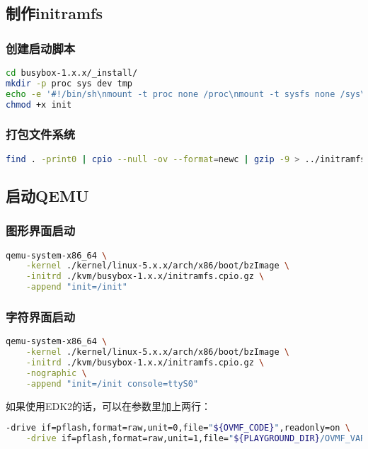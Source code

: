 \subsection{制作initramfs}
\subsubsection{创建启动脚本}
\begin{lstlisting}[language=bash, language=bash, showstringspaces=false]
cd busybox-1.x.x/_install/
mkdir -p proc sys dev tmp
echo -e '#!/bin/sh\nmount -t proc none /proc\nmount -t sysfs none /sys\nmount -t tmpfs none /tmp\nmount -t devtmpfs none /dev\necho "Hello Linux!"\nexec /bin/sh' > init
chmod +x init
\end{lstlisting}

\subsubsection{打包文件系统}
\begin{lstlisting}[language=bash]
find . -print0 | cpio --null -ov --format=newc | gzip -9 > ../initramfs.cpio.gz
\end{lstlisting}

\subsection{启动QEMU}
\subsubsection{图形界面启动}
\begin{lstlisting}[language=bash]
qemu-system-x86_64 \
    -kernel ./kernel/linux-5.x.x/arch/x86/boot/bzImage \
    -initrd ./kvm/busybox-1.x.x/initramfs.cpio.gz \
    -append "init=/init"
\end{lstlisting}

\subsubsection{字符界面启动}
\begin{lstlisting}[language=bash, showstringspaces=false]
qemu-system-x86_64 \
    -kernel ./kernel/linux-5.x.x/arch/x86/boot/bzImage \
    -initrd ./kvm/busybox-1.x.x/initramfs.cpio.gz \
    -nographic \
    -append "init=/init console=ttyS0"
\end{lstlisting}
如果使用EDK2的话，可以在参数里加上两行：
\begin{lstlisting}[language=bash]
    -drive if=pflash,format=raw,unit=0,file="${OVMF_CODE}",readonly=on \
    -drive if=pflash,format=raw,unit=1,file="${PLAYGROUND_DIR}/OVMF_VARS.fd" \
\end{lstlisting}

